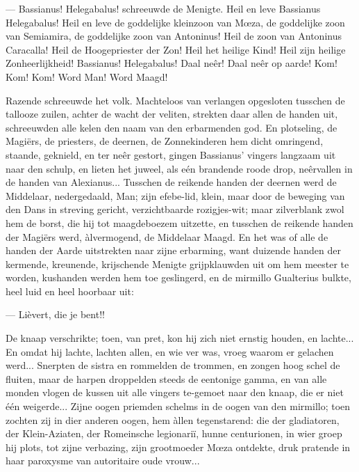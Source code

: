 \documentclass[a4paper, 12pt, oneside, dutch]{article}
\begin{document}
--- Bassianus! Helegabalus! schreeuwde de Menigte. Heil en leve Bassianus Helegabalus! Heil en leve de goddelijke kleinzoon van Mœza, de goddelijke zoon van Semiamira, de goddelijke zoon van Antoninus! Heil de zoon van Antoninus Caracalla! Heil de Hoogepriester der Zon! Heil het heilige Kind! Heil zijn heilige Zonheerlijkheid! Bassianus! Helegabalus! Daal neêr! Daal neêr op aarde! Kom! Kom! Kom! Word Man! Word Maagd!

Razende schreeuwde het volk. Machteloos van verlangen opgesloten tusschen de tallooze zuilen, achter de wacht der veliten, strekten daar allen de handen uit, schreeuwden alle kelen den naam van den erbarmenden god. En plotseling, de Magiërs, de priesters, de deernen, de Zonnekinderen hem dicht omringend, staande, geknield, en ter neêr gestort, gingen Bassianus' vingers langzaam uit naar den schulp, en lieten het juweel, als eén brandende roode drop, neêrvallen in de handen van Alexianus... Tusschen de reikende handen der deernen werd de Middelaar, nedergedaald, Man; zijn efebe-lid, klein, maar door de beweging van den Dans in streving gericht, verzichtbaarde rozigjes-wit; maar zilverblank zwol hem de borst, die hij tot maagdeboezem uitzette, en tusschen de reikende handen der Magiërs werd, àlvermogend, de Middelaar Maagd. En het was of alle de handen der Aarde uitstrekten naar zijne erbarming, want duizende handen der kermende, kreunende, krijschende Menigte grijpklauwden uit om hem meester te worden, kushanden werden hem toe geslingerd, en de mirmillo Gualterius bulkte, heel luid en heel hoorbaar uit:

--- Lièvert, die je bent!!

De knaap verschrikte; toen, van pret, kon hij zich niet ernstig houden, en lachte... En omdat hij lachte, lachten allen, en wie ver was, vroeg waarom er gelachen werd... Snerpten de sistra en rommelden de trommen, en zongen hoog schel de fluiten, maar de harpen droppelden steeds de eentonige gamma, en van alle monden vlogen de kussen uit alle vingers te-gemoet naar den knaap, die er niet één weigerde... Zijne oogen priemden schelms in de oogen van den mirmillo; toen zochten zij in dier anderen oogen, hem àllen tegenstarend: die der gladiatoren, der Klein-Aziaten, der Romeinsche legionariï, hunne centurionen, in wier groep hij plots, tot zijne verbazing, zijn grootmoeder Mœza ontdekte, druk pratende in haar paroxysme van autoritaire oude vrouw...
\end{document}

